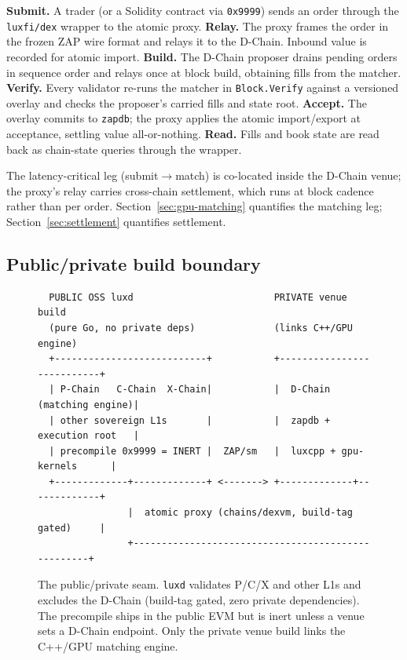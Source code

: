 \begin{algorithm}[H]
\caption{Order lifecycle across the four components}
\begin{algorithmic}[1]
\STATE \textbf{Submit.} A trader (or a Solidity contract via \texttt{0x9999}) sends an
order through the \texttt{luxfi/dex} wrapper to the atomic proxy.
\STATE \textbf{Relay.} The proxy frames the order in the frozen ZAP wire format and
relays it to the D-Chain. Inbound value is recorded for atomic import.
\STATE \textbf{Build.} The D-Chain proposer drains pending orders in sequence order and
relays once at block build, obtaining fills from the matcher.
\STATE \textbf{Verify.} Every validator re-runs the matcher in \texttt{Block.Verify}
against a versioned overlay and checks the proposer's carried fills and state root.
\STATE \textbf{Accept.} The overlay commits to \texttt{zapdb}; the proxy applies the
atomic import/export at acceptance, settling value all-or-nothing.
\STATE \textbf{Read.} Fills and book state are read back as chain-state queries through
the wrapper.
\end{algorithmic}
\end{algorithm}

The latency-critical leg (submit$\to$match) is co-located inside the D-Chain venue; the
proxy's relay carries cross-chain settlement, which runs at block cadence rather than per
order. Section~\ref{sec:gpu-matching} quantifies the matching leg; Section~\ref{sec:settlement}
quantifies settlement.

\subsection{Public/private build boundary}

\begin{figure}[H]
\centering
\begin{verbatim}
  PUBLIC OSS luxd                         PRIVATE venue build
  (pure Go, no private deps)              (links C++/GPU engine)
  +---------------------------+           +---------------------------+
  | P-Chain   C-Chain  X-Chain|           |  D-Chain (matching engine)|
  | other sovereign L1s       |           |  zapdb + execution root   |
  | precompile 0x9999 = INERT |  ZAP/sm   |  luxcpp + gpu-kernels      |
  +-------------+-------------+ <-------> +-------------+-------------+
                |  atomic proxy (chains/dexvm, build-tag gated)     |
                +---------------------------------------------------+
\end{verbatim}
\caption{The public/private seam. \texttt{luxd} validates P/C/X and other L1s and
excludes the D-Chain (build-tag gated, zero private dependencies). The precompile ships
in the public EVM but is inert unless a venue sets a D-Chain endpoint. Only the private
venue build links the C++/GPU matching engine.}
\label{fig:build-boundary}
\end{figure}

